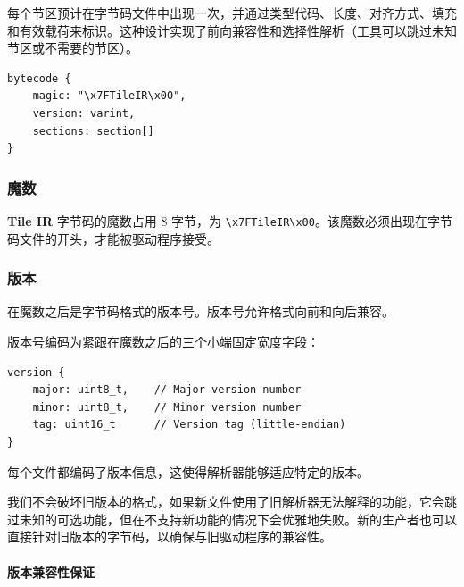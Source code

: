 \documentclass{article}
\begin{document}
每个节区预计在字节码文件中出现一次，并通过类型代码、长度、对齐方式、填充和有效载荷来标识。这种设计实现了前向兼容性和选择性解析（工具可以跳过未知节区或不需要的节区）。


\begin{lstlisting}
bytecode {
    magic: "\x7FTileIR\x00",
    version: varint,
    sections: section[]
}
\end{lstlisting}

\subsubsection{魔数}

\textbf{Tile IR} 字节码的魔数占用 8 字节，为 \texttt{\textbackslash{}x7FTileIR\textbackslash{}x00}。该魔数必须出现在字节码文件的开头，才能被驱动程序接受。



\subsubsection{版本}

在魔数之后是字节码格式的版本号。版本号允许格式向前和向后兼容。


版本号编码为紧跟在魔数之后的三个小端固定宽度字段：


\begin{lstlisting}
version {
    major: uint8_t,    // Major version number
    minor: uint8_t,    // Minor version number
    tag: uint16_t      // Version tag (little-endian)
}
\end{lstlisting}

每个文件都编码了版本信息，这使得解析器能够适应特定的版本。

我们不会破坏旧版本的格式，如果新文件使用了旧解析器无法解释的功能，它会跳过未知的可选功能，但在不支持新功能的情况下会优雅地失败。新的生产者也可以直接针对旧版本的字节码，以确保与旧驱动程序的兼容性。


\paragraph{版本兼容性保证}
\end{document}
